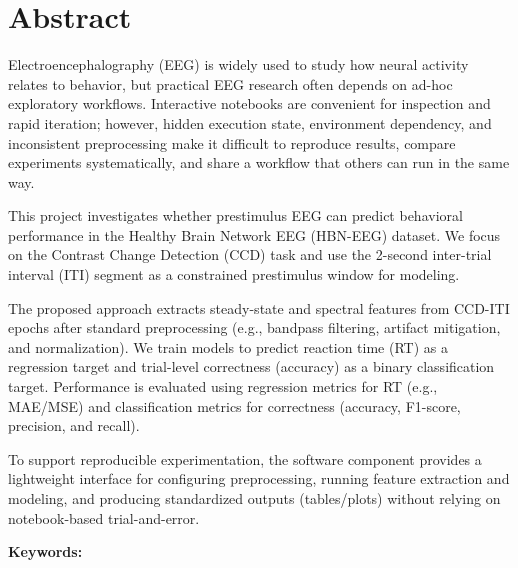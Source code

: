 \chapter*{Abstract}
\label{chap:abstract}

Electroencephalography (EEG) is widely used to study how neural activity relates to behavior, but practical EEG research often depends on ad-hoc exploratory workflows. Interactive notebooks are convenient for inspection and rapid iteration; however, hidden execution state, environment dependency, and inconsistent preprocessing make it difficult to reproduce results, compare experiments systematically, and share a workflow that others can run in the same way.

This project investigates whether prestimulus EEG can predict behavioral performance in the Healthy Brain Network EEG (HBN-EEG) dataset. We focus on the Contrast Change Detection (CCD) task and use the 2-second inter-trial interval (ITI) segment as a constrained prestimulus window for modeling.

The proposed approach extracts steady-state and spectral features from CCD-ITI epochs after standard preprocessing (e.g., bandpass filtering, artifact mitigation, and normalization). We train models to predict reaction time (RT) as a regression target and trial-level correctness (accuracy) as a binary classification target. Performance is evaluated using regression metrics for RT (e.g., MAE/MSE) and classification metrics for correctness (accuracy, F1-score, precision, and recall).

To support reproducible experimentation, the software component provides a lightweight interface for configuring preprocessing, running feature extraction and modeling, and producing standardized outputs (tables/plots) without relying on notebook-based trial-and-error.

\vspace{0.75em}
\noindent\textbf{Keywords:} \usevar{\srsKeywords}
